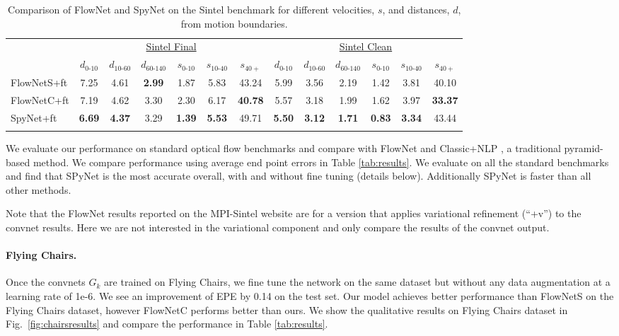 \documentclass[10pt,twocolumn,letterpaper]{article}
\begin{document}
\begin{table*}
\begin{center}
\begin{tabular}{lcccccccccccc}
\Xhline{4\arrayrulewidth}
\multicolumn{1}{l}{Method} & \multicolumn{6}{c}{\underline{\qquad \qquad \qquad \quad Sintel Final \quad \qquad \qquad \qquad}} & \multicolumn{6}{c}{\underline{\qquad \qquad \qquad \quad Sintel Clean \quad \qquad \qquad \qquad}} \\ 
 & $d_{0\text{-}10}$ & $d_{10\text{-}60}$ & $d_{60\text{-}140}$ & $s_{0\text{-}10}$ & $s_{10\text{-}40}$ & $s_{40+}$ & $d_{0\text{-}10}$ & $d_{10\text{-}60}$ & $d_{60\text{-}140}$ & $s_{0\text{-}10}$ & $s_{10\text{-}40}$ & $s_{40+}$\\ \hline
FlowNetS+ft & 7.25 & 4.61 &\textbf{ 2.99} & 1.87 & 5.83 & 43.24 & 5.99 & 3.56 & 2.19 & 1.42 & 3.81 & 40.10 \\ 
FlowNetC+ft & 7.19 & 4.62 & 3.30 & 2.30 & 6.17 & \textbf{40.78} & 5.57 & 3.18 & 1.99 & 1.62 & 3.97 & \textbf{33.37 }\\ 
SpyNet+ft & \textbf{6.69} & \textbf{4.37} & 3.29 &\textbf{ 1.39} & \textbf{5.53 }& 49.71 & \textbf{5.50} & \textbf{3.12} & \textbf{1.71 }& \textbf{0.83} & \textbf{3.34 }& 43.44 \\ \Xhline{4\arrayrulewidth}
\end{tabular}
\end{center}
\caption{Comparison of FlowNet and SpyNet on the Sintel benchmark for different velocities, $s$, and distances, $d$, from motion boundaries.}
\label{tab:sintel}
\end{table*}

We evaluate our performance on standard optical flow benchmarks and compare with FlowNet \cite{dosovitskiy2015flownet}
and Classic+NLP \cite{sun2014quantitative}, a traditional pyramid-based method.
We compare performance using average end point errors in Table \ref{tab:results}.
We evaluate on all the standard benchmarks and find that 
SPyNet is the most accurate overall, with and without fine tuning (details below).
Additionally SPyNet is faster than all other methods. 

Note that the FlowNet results reported on the MPI-Sintel website are for a version that applies variational refinement (``+v'') to the convnet results.
Here we are not interested in the variational component and only compare the results of the convnet output.

\paragraph{Flying Chairs.}
Once the convnets $G_k$ are trained on Flying Chairs, we fine tune the network on the same dataset but without any data augmentation at a learning rate of 1e-6. 
We see an improvement of EPE by 0.14 on the test set. 
Our model achieves better performance than FlowNetS \cite{dosovitskiy2015flownet} on the Flying Chairs dataset, however FlowNetC \cite{dosovitskiy2015flownet} performs better than ours. 
We show the qualitative results on Flying Chairs dataset in Fig.~\ref{fig:chairsresults} and compare the performance in Table \ref{tab:results}.
\end{document}
